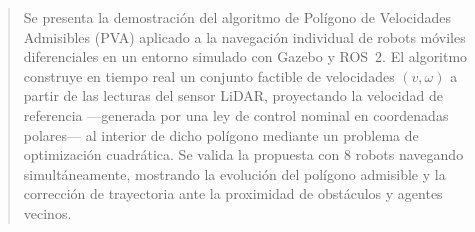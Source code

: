 \begin{abstract}
Se presenta la demostración del algoritmo de Polígono de Velocidades Admisibles (PVA) aplicado a la navegación individual de robots móviles diferenciales en un entorno simulado con Gazebo y ROS~2. El algoritmo construye en tiempo real un conjunto factible de velocidades $(v, \omega)$ a partir de las lecturas del sensor LiDAR, proyectando la velocidad de referencia —generada por una ley de control nominal en coordenadas polares— al interior de dicho polígono mediante un problema de optimización cuadrática. Se valida la propuesta con 8 robots navegando simultáneamente, mostrando la evolución del polígono admisible y la corrección de trayectoria ante la proximidad de obstáculos y agentes vecinos.
\end{abstract}
